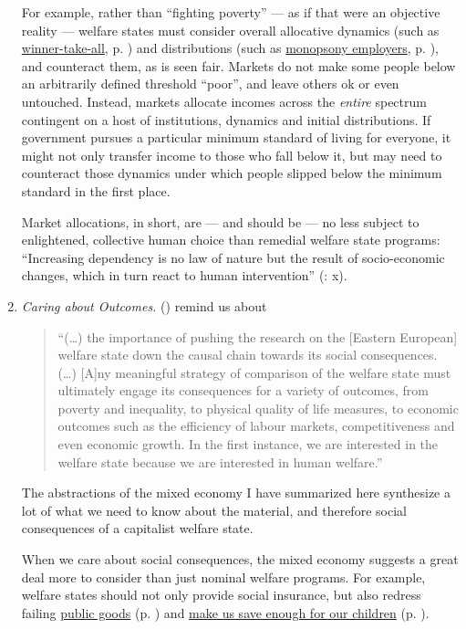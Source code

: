 \begin{enumerate}
	For example, rather than ``fighting poverty'' --- as if that were an objective reality --- welfare states must consider overall allocative dynamics (such as \hyperref[sec:winner-take-all]{winner-take-all}, p. \pageref{sec:winner-take-all}) and distributions (such as \hyperref[sec:monopsonyemployers]{monopsony employers}, p. \pageref{sec:monopsonyemployers}), and counteract them, as is seen fair. Markets do not make some people below an arbitrarily defined threshold ``poor'', and leave others ok or even untouched. Instead, markets allocate incomes across the \emph{entire} spectrum contingent on a host of institutions, dynamics and initial distributions. If government pursues a particular minimum standard of living for everyone, it might not only transfer income to those who fall below it, but may need to counteract those dynamics under which people slipped below the minimum standard in the first place. 
	
	Market allocations, in short, are --- and should be --- no less subject to enlightened, collective human choice than remedial welfare state programs: ``Increasing dependency is no law of nature but the result of socio-economic changes, which in turn react to human intervention'' (\citealt{Esping-Andersen2002}: x).
	
	\item \emph{Caring about Outcomes.} \citeauthor{Haggard2009} (\citeyear[236]{Haggard2009}) remind us about
		\begin{quote}
			``(\ldots) the importance of pushing the research on the [Eastern European] welfare state down the causal chain towards its social consequences. (\ldots) [A]ny meaningful strategy of comparison of the welfare state must ultimately engage its consequences for a variety of outcomes, from poverty and inequality, to physical quality of life measures, to economic outcomes such as the efficiency of labour markets, competitiveness and even economic growth. In the first instance, we are interested in the welfare state because we are interested in human welfare.''
		\end{quote}
	
	The abstractions of the mixed economy I have summarized here synthesize a lot of what we need to know about the material, and therefore social consequences of a capitalist welfare state. 

	When we care about social consequences, the mixed economy suggests a great deal more to consider than just nominal welfare programs. For example, welfare states should not only provide social insurance, but also redress failing \hyperref[sec:publicgood]{public goods} (p. \pageref{sec:publicgood}) and \hyperref[sec:long-terminconsistency]{make us save enough for our children} (p. \pageref{sec:long-terminconsistency}). 
	

\end{enumerate}
